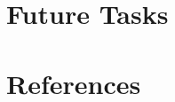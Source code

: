 \documentclass{article}[12 pt]
\begin{document}
\section*{Future Tasks}

\section*{References}










\end{document}
